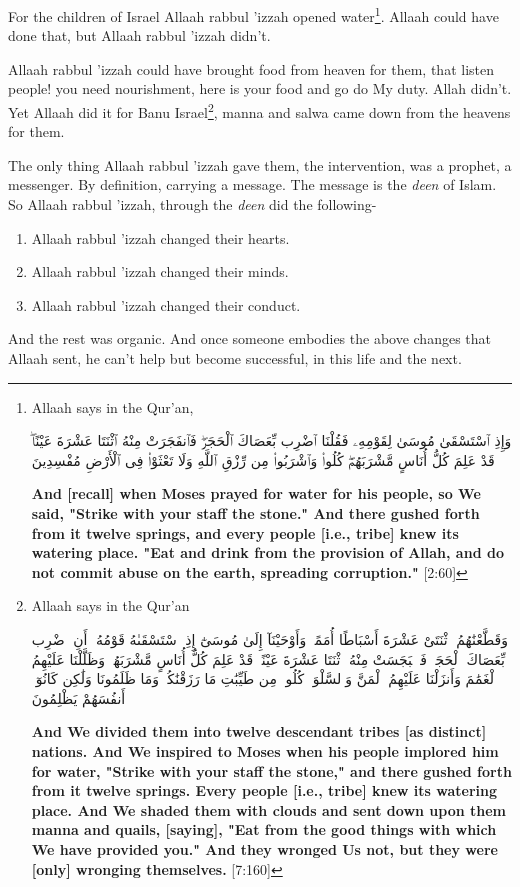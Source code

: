 {For the children of Israel Allaah rabbul 'izzah opened water\footnote{Allaah says in the Qur'an, 

\begin{center}  
\begin{RLtext}  
    وَإِذِ ٱسْتَسْقَىٰ مُوسَىٰ لِقَوْمِهِۦ فَقُلْنَا ٱضْرِب بِّعَصَاكَ ٱلْحَجَرَۖ فَٱنفَجَرَتْ مِنْهُ ٱثْنَتَا عَشْرَةَ عَيْنًاۖ قَدْ عَلِمَ كُلُّ أُنَاسٍ مَّشْرَبَهُمْۖ كُلُوا۟ وَٱشْرَبُوا۟ مِن رِّزْقِ ٱللَّهِ وَلَا تَعْثَوْا۟ فِى 
    ٱلْأَرْضِ مُفْسِدِينَ
\end{RLtext}
\end{center}
\textbf{And [recall] when Moses prayed for water for his people, so We said, "Strike with your staff the stone." And there gushed forth from it twelve springs, and every people [i.e., tribe] knew its watering place. "Eat and drink from the provision of Allah, and do not commit abuse on the earth, spreading corruption."} [2:60]
}. Allaah could have done that, but Allaah rabbul 'izzah didn’t.

Allaah rabbul 'izzah could have brought food from heaven for them, that listen people! you need nourishment, here is your food and go do My duty. Allah didn’t. Yet Allaah did it for Banu Israel\footnote{Allaah says in the Qur'an
\begin{center}
    \begin{RLtext}
        وَقَطَّعْنَٰهُمُ ٱثْنَتَىْ عَشْرَةَ أَسْبَاطًا أُمَمًاۚ وَأَوْحَيْنَآ إِلَىٰ مُوسَىٰٓ إِذِ ٱسْتَسْقَىٰهُ قَوْمُهُۥٓ أَنِ ٱضْرِب بِّعَصَاكَ ٱلْحَجَرَۖ فَٱنۢبَجَسَتْ مِنْهُ ٱثْنَتَا عَشْرَةَ عَيْنًاۖ قَدْ عَلِمَ كُلُّ أُنَاسٍ مَّشْرَبَهُمْۚ وَظَلَّلْنَا عَلَيْهِمُ ٱلْغَمَٰمَ وَأَنزَلْنَا عَلَيْهِمُ ٱلْمَنَّ وَٱلسَّلْوَىٰۖ كُلُوا۟ مِن طَيِّبَٰتِ مَا رَزَقْنَٰكُمْۚ وَمَا ظَلَمُونَا وَلَٰكِن كَانُوٓا۟ أَنفُسَهُمْ يَظْلِمُونَ 
    \end{RLtext}
\end{center}
\textbf{And We divided them into twelve descendant tribes [as distinct] nations. And We inspired to Moses when his people implored him for water, "Strike with your staff the stone," and there gushed forth from it twelve springs. Every people [i.e., tribe] knew its watering place. And We shaded them with clouds and sent down upon them manna and quails, [saying], "Eat from the good things with which We have provided you." And they wronged Us not, but they were [only] wronging themselves.} [7:160]
}, manna and salwa came down from the heavens for them. 

The only thing Allaah rabbul 'izzah gave them, the intervention, was a prophet, a messenger. By definition, carrying a message. The message is the \textit{deen} of Islam. So Allaah rabbul 'izzah, through the \textit{deen} did the following-
\begin{enumerate}[label=\roman *.]
    \item Allaah rabbul 'izzah changed their hearts.
    \item Allaah rabbul 'izzah changed their minds.
    \item Allaah rabbul 'izzah changed their conduct.
\end{enumerate}
And the rest was organic. And once someone embodies the above changes that Allaah sent, he can’t help but become successful, in this life and the next.

}
